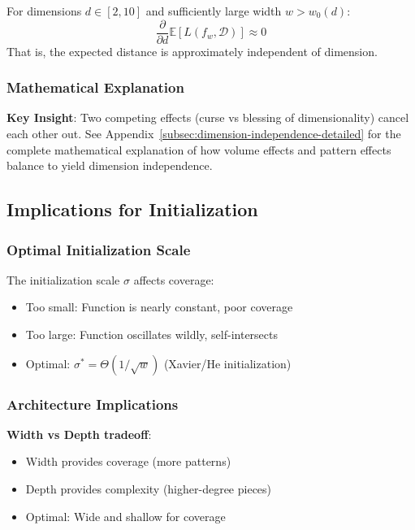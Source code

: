 \begin{theorem}
For dimensions $d \in [2, 10]$ and sufficiently large width $w > w_0(d)$:
$$\frac{\partial}{\partial d} \mathbb{E}[L(f_w, \mathcal{D})] \approx 0$$
That is, the expected distance is approximately independent of dimension.
\end{theorem}

\subsubsection{Mathematical Explanation}

\textbf{Key Insight}: Two competing effects (curse vs blessing of dimensionality) cancel each other out. See Appendix~\ref{subsec:dimension-independence-detailed} for the complete mathematical explanation of how volume effects and pattern effects balance to yield dimension independence.

\subsection{Implications for Initialization}

\subsubsection{Optimal Initialization Scale}

The initialization scale $\sigma$ affects coverage:
\begin{itemize}
    \item Too small: Function is nearly constant, poor coverage
    \item Too large: Function oscillates wildly, self-intersects
    \item Optimal: $\sigma^* = \Theta(1/\sqrt{w})$ (Xavier/He initialization)
\end{itemize}

\subsubsection{Architecture Implications}

\textbf{Width vs Depth tradeoff}:
\begin{itemize}
    \item Width provides coverage (more patterns)
    \item Depth provides complexity (higher-degree pieces)
    \item Optimal: Wide and shallow for coverage
\end{itemize}

